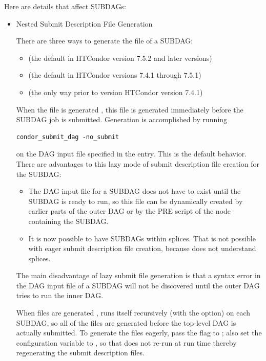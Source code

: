 Here are details that affect SUBDAGs:
\begin{itemize}
\item{Nested Submit Description File Generation}

There are three ways to generate the  file
of a SUBDAG:

\begin{itemize}
\item {} (the default in HTCondor version 7.5.2 and later versions)
\item {} (the default in HTCondor versions 7.4.1 through 7.5.1)
\item {} (the only way prior to version HTCondor version 7.4.1)
\end{itemize}

When the  file is generated ,
this file is generated immediately
before the SUBDAG job is submitted.
Generation is accomplished by running
\begin{verbatim}
condor_submit_dag -no_submit
\end{verbatim}
on the DAG input file specified in the  entry.
This is the default behavior.
There are advantages to this lazy mode of submit description
file creation for the SUBDAG:
\begin{itemize}
\item The DAG input file for a SUBDAG does not have to exist until the SUBDAG
is ready to run, so this file can be dynamically created by earlier
parts of the outer DAG or by the PRE script of the node containing the SUBDAG.
\item It is now possible to have SUBDAGs within splices. 
That is not
possible with eager submit description file creation,
because  does not understand splices.
\end{itemize}

The main disadvantage of lazy submit file generation is that 
a syntax error in the DAG input file of a SUBDAG will not be discovered
until the outer DAG tries to run the inner DAG.

When  files are generated ,
 runs itself recursively (with the 
option) on each SUBDAG, so all of the  files
are generated before the top-level DAG is actually submitted.
To generate the  files eagerly, 
pass the  flag to ; 
also set the  configuration variable
to , so that  does not re-run
 at run time thereby regenerating 
the submit description files.


\end{itemize}
